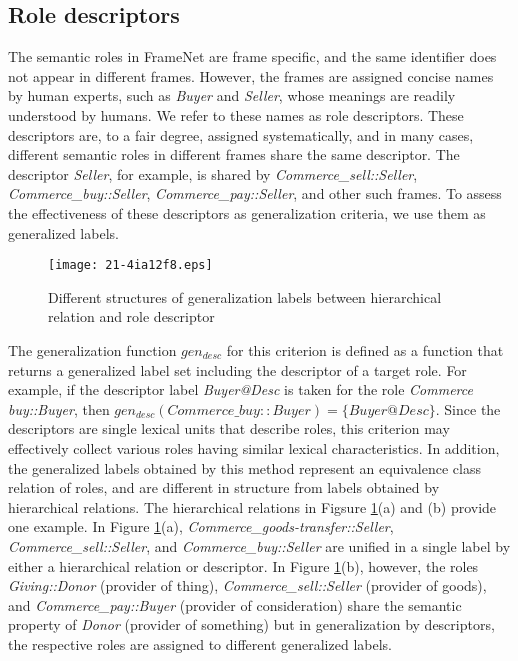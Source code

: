 \documentclass[english]{jnlp_1.4_rep}
\begin{document}
\subsection{Role descriptors}
\label{role-label}

The semantic roles in FrameNet are frame specific, and the same identifier does not appear in different frames. However, the frames are assigned concise names by human experts, such as {\it Buyer} and {\it Seller}, whose meanings are readily understood by humans. We refer to these names as role descriptors. These descriptors are, to a fair degree, assigned systematically, and in many cases, different semantic roles in different frames share the same descriptor. The descriptor {\it Seller}, for example, is shared by {\it Commerce\_sell::Seller}, {\it Commerce\_buy::Seller}, {\it Commerce\_pay::Seller}, and other such frames. To assess the effectiveness of these descriptors as generalization criteria, we use them as generalized labels.

\begin{figure}[t]
\begin{center}
\texttt{[image: 21-4ia12f8.eps]}
\end{center}
\caption{Different structures of generalization labels between hierarchical relation and role descriptor}
\label{fig:descriptor-example}
\end{figure}

The generalization function $gen_{desc}$ for this criterion is defined as a function that returns a generalized label set including the descriptor of a target role. For example, if the descriptor label {\it Buyer@Desc} is taken for the role {\it Commerce buy::Buyer}, then
$gen_{desc}(\mathit{Commerce\_buy::Buyer}) = \{\mathit{Buyer@Desc}\}$.
Since the descriptors are single lexical units that describe roles, this criterion may effectively collect various roles having similar lexical characteristics. In addition, the generalized labels obtained by this method represent an equivalence class relation of roles, and are different in structure from labels obtained by hierarchical relations. The hierarchical relations in Figsure \ref{fig:descriptor-example}(a) and (b) provide one example. In Figure \ref{fig:descriptor-example}(a), {\it Commerce\_goods-transfer::Seller}, {\it Commerce\_sell::Seller}, and {\it Commerce\_buy::Seller} are unified in a single label by either a hierarchical relation or descriptor. In Figure \ref{fig:descriptor-example}(b), however, the roles {\it
Giving::Donor} (provider of thing), {\it Commerce\_sell::Seller} (provider of goods), and {\it
Commerce\_pay::Buyer} (provider of consideration) share the semantic property of {\it Donor} (provider of something) but in generalization by descriptors, the respective roles are assigned to different generalized labels.
\end{document}
